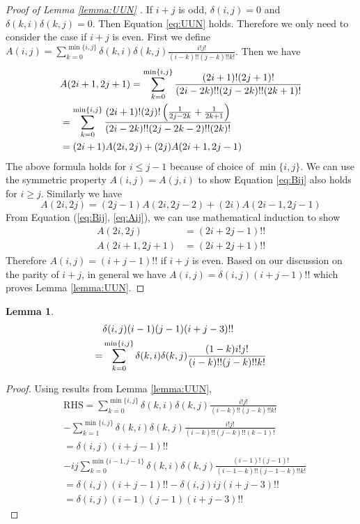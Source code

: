 \documentclass[conference,letterpaper]{IEEEtran}
\newtheorem{lemma}{Lemma}
\begin{document}
\begin{proof}[Proof of Lemma \ref{lemma:UUN} ]
If $ i + j $ is odd, $ \delta(i, j) = 0 $ and
$ \delta(k, i)\delta(k, j) = 0 $. Then Equation \eqref{eq:UUN} holds.
Therefore we only need to consider the case if $ i + j $ is even.
First we define $A(i, j) = \sum_{k=0}^{\min\{i, j\}}
\delta(k, i) \delta(k, j) \frac{i! j!}{(i-k)!!(j-k)!! k!}$.
Then we have
\begin{align}
& A(2i+1, 2j+1) = \sum_{k=0}^{\min\{i,j\}}
\frac{(2i+1)!(2j+1)!}{(2i-2k)!!(2j-2k)!!(2k+1)!} \notag\\
&= \sum_{k=0}^{\min\{i,j\}}
\frac{(2i+1)!(2j)!\left(\frac{1}{2j-2k} + \frac{1}{2k+1}\right)}{(2i-2k)!!(2j-2k-2)!!(2k)!}
 \notag\\
&= (2i + 1) A(2i, 2j) + (2j) A(2i+1, 2j-1) \label{eq:Bij}
\end{align}
The above formula holds for $ i \leq j-1 $ because of choice of $\min\{i,j\}$.
We can use the symmetric property $A(i,j)=A(j,i)$
to show Equation \eqref{eq:Bij} also holds for $ i \geq j $.
Similarly we have
\begin{equation}\label{eq:Aij}
A(2i, 2j) = (2j - 1) A(2i, 2j-2) + (2i) A(2i-1, 2j-1)
\end{equation}
From Equation (\ref{eq:Bij}, \ref{eq:Aij}), we can use mathematical induction to show
\begin{align*}\label{eq:UUN_conclusion}
A(2i, 2j) & = (2i + 2j - 1)!! \\
A(2i+1, 2j+1) & = (2i + 2j + 1)!!
\end{align*}
Therefore $A(i,j) = (i+j-1)!!$ if $i + j $ is even.
Based on our discussion on the parity of $i+j$, in general we have $A(i,j)=\delta(i,j)(i+j-1)!!$
which proves Lemma \ref{lemma:UUN}.
\end{proof}
\begin{lemma}\label{lemma:UUM}
\begin{align}
&\delta(i, j)(i-1)(j-1)(i+j-3)!!  \notag\\
=&\sum_{k=0}^{\min\{i, j\}}
\delta(k, i) \delta(k, j) \frac{(1-k)i!j!}{(i-k)!!(j-k)!!k!}
\end{align}
\end{lemma}
\begin{proof}
Using results from Lemma \ref{lemma:UUN},
\begin{align*}
& \textrm{RHS}  = \sum_{k=0}^{\min\{i, j\}}
\delta(k, i) \delta(k, j) \frac{i!j!}{(i-k)!!(j-k)!!k!} \\
&- \sum_{k=1}^{\min\{i, j\}}
\delta(k, i) \delta(k, j) \frac{i!j!}{(i-k)!!(j-k)!!(k-1)!} \\
& = \delta(i, j)(i+j-1)!! \\
& - ij\sum_{k=0}^{\min\{i-1, j-1\}}
\delta(k, i) \delta(k, j) \frac{(i-1)!(j-1)!}{(i-1-k)!!(j-1-k)!!k!} \\
& = \delta(i, j)(i+j-1)!! - \delta(i, j)ij(i+j-3)!! \\
& = \delta(i, j)(i-1)(j-1)(i+j-3)!!
\end{align*}
\end{proof}
\end{document}
